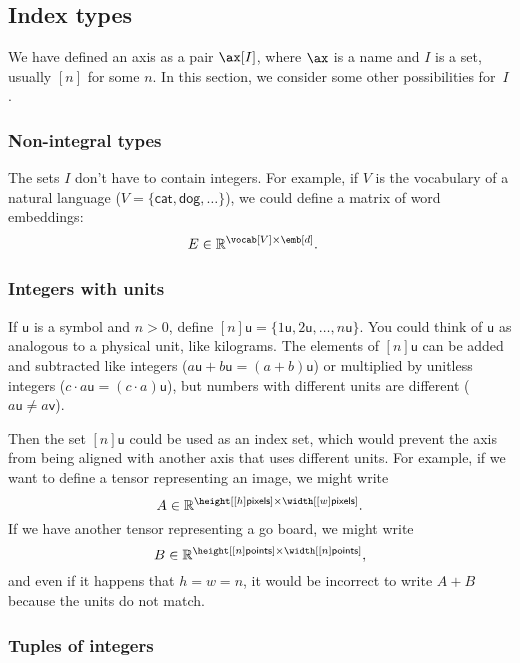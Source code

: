 \subsection{Index types}

We have defined an axis as a pair $\ax[I]$, where $\ax$ is a name and $I$ is a set, usually $[n]$ for some $n$. In this section, we consider some other possibilities for~$I$.

\subsubsection{Non-integral types}

The sets $I$ don't have to contain integers. For example, if $V$ is the vocabulary of a natural language ($V = \{ \textsf{cat}, \textsf{dog}, \ldots \}$), we could define a matrix of word embeddings:
\begin{align*}
  E &\in \mathbb{R}^{\vocab[V] \times \emb[d]}.
\end{align*}

\subsubsection{Integers with units}

\newcommand{\unit}[1]{\mathord{\mathsf{#1}}}

If $\mathsf{u}$ is a symbol and $n > 0$, define $[n]\unit{u} = \{1\unit{u}, 2\unit{u}, \ldots, n\unit{u}\}$. You could think of $\unit{u}$ as analogous to a physical unit, like kilograms. The elements of $[n]\unit{u}$ can be added and subtracted like integers ($a\unit{u} + b\unit{u} = (a+b)\unit{u}$) or multiplied by unitless integers ($c \cdot a\unit{u} = (c \cdot a) \unit{u}$), but numbers with different units are different ($a \unit{u} \neq a \unit{v}$).

Then the set $[n]\unit{u}$ could be used as an index set, which would prevent the axis from being aligned with another axis that uses different units. For example, if we want to define a tensor representing an image, we might write
\[ A \in \mathbb{R}^{\height[[h]\unit{pixels}] \times \width[[w]\unit{pixels}]}. \]
If we have another tensor representing a go board, we might write
\[ B \in \mathbb{R}^{\height[[n]\unit{points}] \times \width[[n]\unit{points}]}, \]
and even if it happens that $h = w = n$, it would be incorrect to write $A+B$ because the units do not match.

\subsubsection{Tuples of integers}

